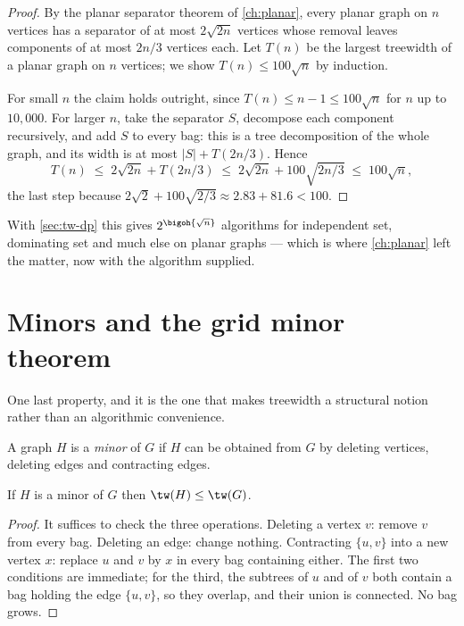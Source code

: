 \begin{proof}
By the planar separator theorem of \cref{ch:planar}, every planar graph on $n$
vertices has a separator of at most $2\sqrt{2n}$ vertices whose removal leaves
components of at most $2n/3$ vertices each. Let $T(n)$ be the largest treewidth
of a planar graph on $n$ vertices; we show $T(n) \le 100\sqrt n$ by induction.

For small $n$ the claim holds outright, since $T(n) \le n-1 \le 100\sqrt n$ for
$n$ up to $10{,}000$. For larger $n$, take the separator $S$, decompose each
component recursively, and add $S$ to every bag: this is a tree decomposition
of the whole graph, and its width is at most $|S| + T(2n/3)$. Hence
\[ T(n) \;\le\; 2\sqrt{2n} + T(2n/3) \;\le\; 2\sqrt{2n} + 100\sqrt{2n/3}
        \;\le\; 100\sqrt{n}, \]
the last step because $2\sqrt2 + 100\sqrt{2/3} \approx 2.83 + 81.6 < 100$.
\end{proof}

With \cref{sec:tw-dp} this gives $2^{\bigoh{\sqrt n}}$ algorithms for
independent set, dominating set and much else on planar graphs --- which is
where \cref{ch:planar} left the matter, now with the algorithm supplied.

\section{Minors and the grid minor theorem}
\label{sec:tw-minors}

One last property, and it is the one that makes treewidth a structural notion
rather than an algorithmic convenience.

\begin{definition}[Minor]\label{def:minor}
A graph $H$ is a \emph{minor} of $G$ if $H$ can be obtained from $G$ by deleting
vertices, deleting edges and contracting edges.
\end{definition}

\begin{proposition}\label{prop:tw-minor-monotone}
If $H$ is a minor of $G$ then $\tw(H) \le \tw(G)$.
\end{proposition}

\begin{proof}
It suffices to check the three operations. Deleting a vertex $v$: remove $v$
from every bag. Deleting an edge: change nothing. Contracting $\{u,v\}$ into a
new vertex $x$: replace $u$ and $v$ by $x$ in every bag containing either. The
first two conditions are immediate; for the third, the subtrees of $u$ and of
$v$ both contain a bag holding the edge $\{u,v\}$, so they overlap, and their
union is connected. No bag grows.
\end{proof}

